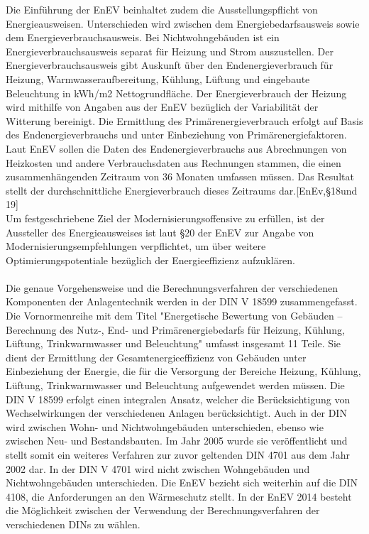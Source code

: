Die Einführung der EnEV beinhaltet zudem die Ausstellungspflicht von Energieausweisen. Unterschieden wird zwischen dem  Energiebedarfsausweis sowie dem Energieverbrauchsausweis. Bei Nichtwohngebäuden ist ein Energieverbrauchsausweis separat für Heizung und Strom auszustellen. Der Energieverbrauchsausweis gibt Auskunft über den Endenergieverbrauch für Heizung, Warmwasseraufbereitung, Kühlung, Lüftung und eingebaute Beleuchtung in kWh/m2 Nettogrundfläche. Der Energieverbrauch der Heizung wird mithilfe von Angaben aus der EnEV bezüglich der Variabilität der Witterung bereinigt. Die Ermittlung des Primärenergieverbrauch erfolgt auf Basis des Endenergieverbrauchs und unter Einbeziehung von Primärenergiefaktoren. Laut EnEV sollen die Daten des Endenergieverbrauchs  aus Abrechnungen von Heizkosten und andere Verbrauchsdaten aus Rechnungen stammen, die  einen zusammenhängenden Zeitraum von 36 Monaten umfassen müssen. Das Resultat stellt der durchschnittliche Energieverbrauch dieses Zeitraums dar.[EnEv,§18und 19] \\
Um festgeschriebene Ziel der Modernisierungsoffensive zu erfüllen, ist der Aussteller des Energieausweises ist laut §20 der EnEV zur Angabe von Modernisierungsempfehlungen verpflichtet, um über weitere Optimierungspotentiale bezüglich der Energieeffizienz aufzuklären.\\
\\
Die genaue Vorgehensweise und die Berechnungsverfahren der verschiedenen Komponenten der Anlagentechnik werden in der DIN V 18599 zusammengefasst. Die Vornormenreihe mit dem Titel "Energetische Bewertung von Gebäuden – Berechnung des Nutz-, End- und Primärenergiebedarfs für Heizung, Kühlung, Lüftung, Trinkwarmwasser und Beleuchtung" umfasst insgesamt 11 Teile. Sie dient der Ermittlung der Gesamtenergieeffizienz von Gebäuden unter Einbeziehung der Energie, die für die Versorgung der Bereiche Heizung, Kühlung, Lüftung, Trinkwarmwasser und Beleuchtung aufgewendet werden müssen. Die DIN V 18599 erfolgt einen integralen Ansatz, welcher die Berücksichtigung von Wechselwirkungen der verschiedenen Anlagen berücksichtigt. Auch in der DIN wird zwischen Wohn- und Nichtwohngebäuden unterschieden, ebenso wie zwischen Neu- und Bestandsbauten. Im Jahr 2005 wurde sie veröffentlicht und stellt somit ein weiteres Verfahren zur zuvor geltenden DIN 4701 aus dem Jahr 2002 dar. In der DIN V 4701 wird nicht zwischen Wohngebäuden und Nichtwohngebäuden unterschieden. Die EnEV bezieht sich weiterhin auf die DIN 4108, die Anforderungen an den Wärmeschutz stellt. In der EnEV 2014 besteht die Möglichkeit zwischen der Verwendung der Berechnungsverfahren der verschiedenen DINs zu wählen. \\
